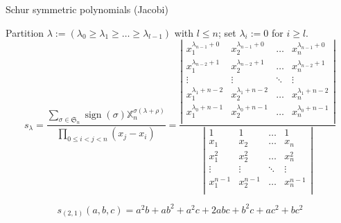 \documentclass[compress,11pt]{beamer}
\newcommand{\XX}{{\mathbb X}}
\newcommand{\SG}{{\mathfrak S}}
\renewcommand{\emph}[1]{{\color{red} #1}}
\begin{document}


\begin{frame}{Schur symmetric polynomials (Jacobi)}

  \begin{DEFN}
    \small Partition $\lambda :=
    (\lambda_0\geq\lambda_1\geq\dots\geq\lambda_{l-1})$ with $l\leq
    n$; set $\lambda_i:=0$ for $i\geq l$.
    \[
    s_{\lambda} = 
    \frac{\sum_{\sigma\in\SG_n} \operatorname{sign}(\sigma)
      \XX_n^{\sigma(\lambda+\rho)}}%
    {\prod_{0\leq i<j<n} (x_j - x_i)}
    = \frac{\left|
       \begin{smallmatrix}
         x_1^{\lambda_{n-1}+0}  & x_2^{\lambda_{n-1}+0}   & \dots  & x_n^{\lambda_{n-1}+0}  \\
         x_1^{\lambda_{n-2}+1}  & x_2^{\lambda_{n-2}+1}   & \dots  & x_n^{\lambda_{n-2}+1}  \\
         \vdots & \vdots & \ddots & \vdots \\
         x_1^{\lambda_1+n-2}  & x_2^{\lambda_1+n-2}   & \dots  & x_n^{\lambda_1+n-2}  \\
         x_1^{\lambda_0+n-1}  & x_2^{\lambda_0+n-1}   & \dots  & x_n^{\lambda_0+n-1}  \\
      \end{smallmatrix}
      \right|
    }{\left|
       \begin{smallmatrix}
         1      & 1      & \dots  & 1     \\
         x_1    & x_2    & \dots  & x_n    \\
         x_1^2  & x_2^2   & \dots  & x_n^2  \\
         \vdots & \vdots & \ddots & \vdots \\
         x_1^{n-1}  & x_2^{n-1}   & \dots  & x_n^{n-1}  \\
      \end{smallmatrix}
      \right|
    }
    \]
  \end{DEFN}
  \[s_{(2,1)}(a,b,c) = a^2b + ab^2 + a^2c + 2abc + b^2c + ac^2 + bc^2\]
\end{frame}
\end{document}
